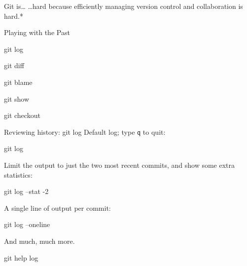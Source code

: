 \begin{frame}{Git is\ldots}
  \hangindent=30pt \Huge {
  \ldots hard because efficiently managing version control and collaboration is
  hard.*
  }
\end{frame}

\begin{frame}[fragile]{Playing with the Past}
  \begin{gitCommand}git log\end{gitCommand}
  \begin{gitCommand}git diff\end{gitCommand}
  \begin{gitCommand}git blame\end{gitCommand}
  \begin{gitCommand}git show\end{gitCommand}
  \begin{gitCommand}git checkout\end{gitCommand}
\end{frame}

\begin{frame}[fragile]{Reviewing history: git log}
  Default log; type \texttt{q} to quit:

  \begin{gitCommand}git log\end{gitCommand}

  Limit the output to just the two most recent commits, and show some extra
  statistics:

  \begin{gitCommand}git log --stat -2\end{gitCommand}

  A single line of output per commit:

  \begin{gitCommand}git log --oneline\end{gitCommand}

  And much, much more.

  \begin{gitCommand}git help log\end{gitCommand}
\end{frame}

